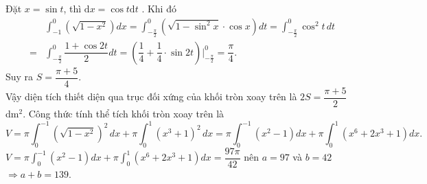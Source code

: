 \begin{ex}
{\begin{itemchoice}
			Đặt $x=\sin t$, thì $\mathrm{d}x=\cos t\mathrm{d}t$ . Khi  đó
			\allowdisplaybreaks 
			\begin{eqnarray*}
				&&\displaystyle\int_{-1}^0\left(\sqrt{1-x^2}\right)dx=\displaystyle\int_{-\tfrac{\pi}{2}}^0\left(\sqrt{1-\sin ^2x}\cdot\cos  x\right)dt=\displaystyle\int_{-\tfrac{\pi}{2}}^0\cos^2t\,dt\\
				&=&\displaystyle\int_{-\tfrac{\pi}{2}}^0\dfrac{1+\cos 2t}{2}dt=\left(\dfrac{1}{4}+\dfrac{1}{4}\cdot\sin 2t\right)\Bigg|_{-\tfrac{\pi}{2}}^0=\dfrac{\pi}{4}. 
			\end{eqnarray*}
			Suy ra $S=\dfrac{\pi+5}{4}$.\\ 
			Vậy diện tích thiết diện qua trục đối xứng của khối tròn xoay trên là $2S=\dfrac{\pi+5}{2}$ dm$^2$. 
			\itemch Công thức tính thể tích khối tròn xoay trên là  \[V=\pi\displaystyle\int_0^{-1}{\left(\sqrt{1-x^2}\right)^2\,dx}+\pi\displaystyle\int_0^1\left(x^3+1\right)^2\,dx=\pi\displaystyle\int_0^{-1}{\left(x^2-1\right)dx}+\pi\displaystyle\int_0^1\left(x^6+2x^3+1\right)dx.\]
			\itemch $V=\pi\displaystyle\int_0^{-1}{\left(x^2-1\right)dx}+\pi\displaystyle\int_0^1\left(x^6+2x^3+1\right)dx=\dfrac{97\pi}{42}$  nên $a=97$ và $b=42$ $\Rightarrow a+b=139$.
		\end{itemchoice}
	 }
\end{ex}

